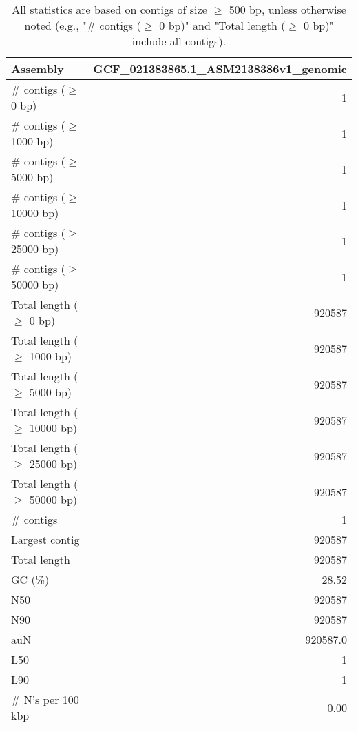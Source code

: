 \documentclass[12pt,a4paper]{article}
\begin{document}
\begin{table}[ht]
\begin{center}
\caption{All statistics are based on contigs of size $\geq$ 500 bp, unless otherwise noted (e.g., "\# contigs ($\geq$ 0 bp)" and "Total length ($\geq$ 0 bp)" include all contigs).}
\begin{tabular}{|l*{1}{|r}|}
\hline
Assembly & GCF\_021383865.1\_ASM2138386v1\_genomic \\ \hline
\# contigs ($\geq$ 0 bp) & 1 \\ \hline
\# contigs ($\geq$ 1000 bp) & 1 \\ \hline
\# contigs ($\geq$ 5000 bp) & 1 \\ \hline
\# contigs ($\geq$ 10000 bp) & 1 \\ \hline
\# contigs ($\geq$ 25000 bp) & 1 \\ \hline
\# contigs ($\geq$ 50000 bp) & 1 \\ \hline
Total length ($\geq$ 0 bp) & 920587 \\ \hline
Total length ($\geq$ 1000 bp) & 920587 \\ \hline
Total length ($\geq$ 5000 bp) & 920587 \\ \hline
Total length ($\geq$ 10000 bp) & 920587 \\ \hline
Total length ($\geq$ 25000 bp) & 920587 \\ \hline
Total length ($\geq$ 50000 bp) & 920587 \\ \hline
\# contigs & 1 \\ \hline
Largest contig & 920587 \\ \hline
Total length & 920587 \\ \hline
GC (\%) & 28.52 \\ \hline
N50 & 920587 \\ \hline
N90 & 920587 \\ \hline
auN & 920587.0 \\ \hline
L50 & 1 \\ \hline
L90 & 1 \\ \hline
\# N's per 100 kbp & 0.00 \\ \hline
\end{tabular}
\end{center}
\end{table}
\end{document}
